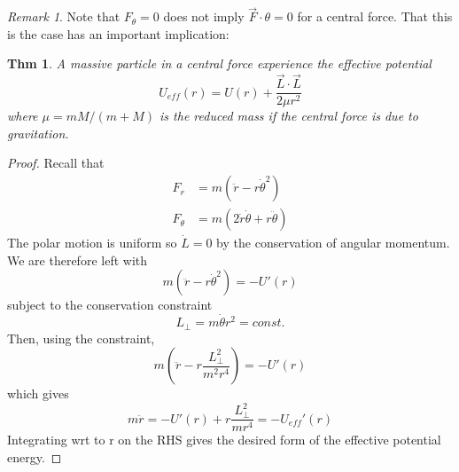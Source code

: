 \documentclass{article}
\newtheorem*{theorem}{Thm}
\theoremstyle{definition}
\theoremstyle{remark}
\newtheorem*{remark}{Remark}
\begin{document}
\begin{remark}
  Note that $F_\theta=0$ does not imply $\vec F\cdot \theta=0$ for a central force. That this is the case has an important implication:
\end{remark}

\begin{theorem}
  A massive particle in a central force experience the effective potential
  $$
U_{eff}(r)=U(r)+\frac{\vec L\cdot \vec L}{2\mu r^2}
  $$
  where $\mu=mM/(m+M)$ is the reduced mass if the central force is due to gravitation. 
\end{theorem}
\begin{proof}
  Recall that
  \begin{align*}
     F_r&=m(\ddot r-r\dot \theta^2)\\
  F_\theta&=m(2\dot r\dot \theta+r\ddot \theta)
  \end{align*}
  The polar motion is uniform so $\dot L = 0$ by the conservation of angular momentum. We are therefore left with
  $$
m(\ddot r-r\dot \theta^2) = -U'(r)
  $$
  subject to the conservation constraint
  $$
  L_\perp=m\dot \theta r^2=const.
  $$
  Then, using the constraint,
    $$
m(\ddot r-r\frac{L_\perp^2}{m^2r^4}) = -U'(r)
  $$
 which gives
 $$
m\ddot r = -U'(r)+r\frac{L_\perp^2}{m r^4}=-U_{eff}'(r)
 $$
 Integrating wrt to r on the RHS gives the desired form of the effective potential energy.
\end{proof}
\end{document}
